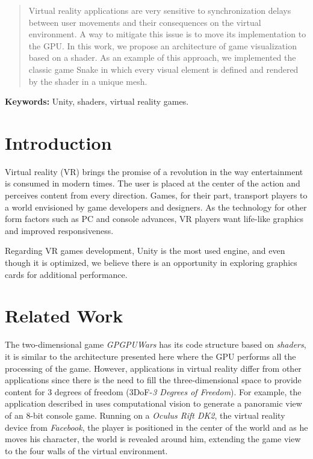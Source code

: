 \documentclass[12pt]{article}
\title{}
\author{Adriano M. Gil\inst{1}, Thiago S. Figueira\inst{1}}
\begin{document}
\maketitle

\begin{abstract}
    Virtual reality applications are very sensitive to synchronization delays between user movements and their consequences on the virtual environment. A way to mitigate this issue is to move its implementation to the GPU. In this work, we propose an architecture of game visualization based on a shader. As an example of this approach, we implemented the classic game Snake in which every visual element is defined and rendered by the shader in a unique mesh.
\end{abstract}

\smallskip

\noindent \textbf{Keywords:} Unity, shaders, virtual reality games.

\section{Introduction} 
Virtual reality (VR) brings the promise of a revolution in the way entertainment is consumed in modern times. The user is placed at the center of the action and perceives content from every direction. Games, for their part,  transport players to a world envisioned by game developers and designers. As the technology for other form factors such as PC and console advances, VR players want life-like graphics and improved responsiveness. 

Regarding VR games development, Unity is the most used engine, and even though it is optimized, we believe there is an opportunity in exploring graphics cards for additional performance. 

\section{Related Work}
The two-dimensional game \textit{GPGPUWars} \cite{GPGPUWars} has its code structure based on \textit{shaders}, it is similar to the architecture presented here where the GPU performs all the processing of the game. However, applications in virtual reality differ from other applications since there is the need to fill the three-dimensional space to provide content for 3 degrees of freedom (3DoF-\textit{3 Degrees of Freedom}). For example, the application described in \cite{zund2015unfolding} uses computational vision to generate a panoramic view of an 8-bit console game. Running on a \textit{Oculus Rift DK2}, the virtual reality device from \textit{Facebook}, the player is positioned in the center of the world and as he moves his character, the world is revealed around him, extending the game view to the four walls of the virtual environment.
\end{document}

